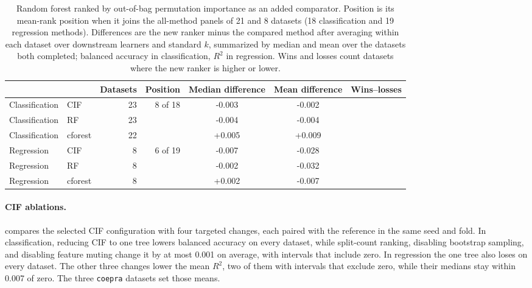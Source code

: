 \begin{table}[!htbp]
  \centering
  \footnotesize
  \setlength{\tabcolsep}{5pt}
  \begin{tabular}{@{}llrrS[table-format=+1.3]S[table-format=+1.3]c@{}}
    \toprule
     &  & {Datasets} & {Position} & {Median difference} & {Mean difference} & Wins--losses \\
    \midrule
    Classification & CIF & 23 & 8 of 18 & -0.003 & -0.002 &  \\
    Classification & RF & 23 & & -0.004 & -0.004 &  \\
    Classification & cforest & 22 & & +0.005 & +0.009 &  \\
    Regression & CIF & 8 & 6 of 19 & -0.007 & -0.028 &  \\
    Regression & RF & 8 & & -0.002 & -0.032 &  \\
    Regression & cforest & 8 & & +0.002 & -0.007 &  \\
    \bottomrule
  \end{tabular}
  \caption{Random forest ranked by out-of-bag permutation importance as an added
  comparator. Position is its mean-rank position when it joins the all-method
  panels of 21 and 8 datasets (18 classification and 19 regression methods).
  Differences are the new ranker minus the compared method after averaging
  within each dataset over downstream learners and standard $k$, summarized by
  median and mean over the datasets both completed; balanced accuracy in
  classification, $R^2$ in regression. Wins and losses count datasets where the new ranker
  is higher or lower.}
  \label{tab:rf-oobperm-benchmark}
\end{table}

\paragraph{CIF ablations.}
 compares the selected CIF configuration with
four targeted changes, each paired with the reference in the same seed and
fold. In classification, reducing CIF to one tree lowers balanced accuracy on
every dataset, while split-count ranking, disabling bootstrap sampling, and
disabling feature muting change it by at most 0.001 on average, with intervals
that include zero. In regression the one tree also loses on every dataset. The
other three changes lower the mean $R^2$, two of them with intervals that
exclude zero, while their medians stay within 0.007 of zero. The three
\nolinkurl{coepra} datasets set those means.

